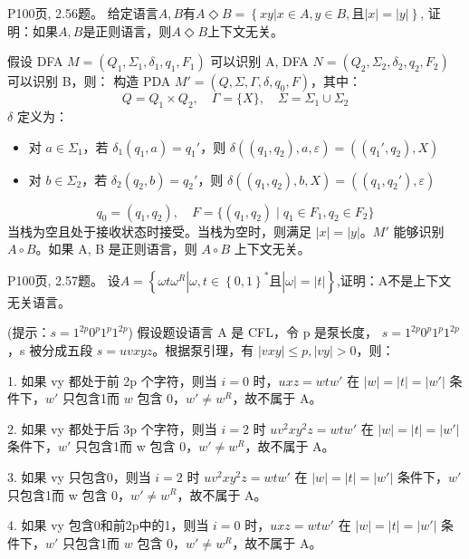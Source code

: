 \documentclass[11pt,addpoints,answers]{exam}
\begin{document}
\begin{questions}
    
	\question P100页, 2.56题。
    给定语言$A,B$有$A \Diamond B=\left\{xy|x\in A,y\in B,\text{且}|x|=|y|\right\}$, 证明：如果$A,B$是正则语言，则$A \Diamond B$上下文无关。
    \begin{solution}
		假设 DFA \( M = (Q_1, \Sigma_1, \delta_1, q_1, F_1) \) 可以识别 A, DFA \( N = (Q_2, \Sigma_2, \delta_2, q_2, F_2) \) 可以识别 B，则：
构造 PDA \( M' = (Q, \Sigma, \Gamma, \delta, q_0, F) \)，其中：
\[
Q = Q_1 \times Q_2, \quad \Gamma = \{X\}, \quad \Sigma = \Sigma_1 \cup \Sigma_2
\]
\(\delta\) 定义为：
\begin{itemize}
    \item 对 \( a \in \Sigma_1 \)，若 \( \delta_1(q_1, a) = q_1' \)，则 \( \delta((q_1, q_2), a, \varepsilon) = ((q_1', q_2), X) \)
    \item 对 \( b \in \Sigma_2 \)，若 \( \delta_2(q_2, b) = q_2' \)，则 \( \delta((q_1, q_2), b, X) = ((q_1, q_2'), \varepsilon) \)
\end{itemize}
\[
q_0 = (q_1, q_2), \quad F = \{(q_1, q_2) \mid q_1 \in F_1, q_2 \in F_2\}
\]
当栈为空且处于接收状态时接受。当栈为空时，则满足 \( |x| = |y| \)。\( M' \) 能够识别 \( A \circ B \)。如果 A, B 是正则语言，则 \( A \circ B \) 上下文无关。
	\end{solution} 


    
    \question P100页, 2.57题。
    设$A=\left\{\omega t \omega^{R}| \omega,t\in \left\{0,1\right\}^* \text{且} |\omega|=|t|\right\}$,证明：A不是上下文无关语言。
    \begin{solution}
		(提示：$s=1^{2p}0^p1^p1^{2p}$)
        假设题设语言 A 是 CFL，令 p 是泵长度， $s=1^{2p}0^p1^p1^{2p}$ ，s 被分成五段 \( s = uvxyz \)。根据泵引理，有 \( |vxy| \leq p, |vy| > 0 \)，则：
        
        1. 如果 vy 都处于前 2p 个字符，则当 \( i = 0 \) 时，\( uxz = wtw' \) 在 \( |w| = |t| = |w'| \) 条件下，\(w'\) 只包含1而 \( w \) 包含 0，\( w' \neq w^R \)，故不属于 A。
        
        2. 如果 vy 都处于后 3p 个字符，则当 \( i = 2 \) 时 \( uv^2xy^2z = wtw' \) 在 \( |w| = |t| = |w'| \) 条件下，\( w' \) 只包含1而 w 包含 0，\( w' \neq w^R \)，故不属于 A。
        
        3. 如果 vy 只包含0，则当 \( i = 2 \) 时 \( uv^2xy^2z = wtw' \) 在 \( |w| = |t| = |w'| \) 条件下，\( w' \) 只包含1而 w 包含 0，\( w' \neq w^R \)，故不属于 A。

        4. 如果 vy 包含0和前2p中的1，则当 \( i = 0 \) 时，\( uxz = wtw' \) 在 \( |w| = |t| = |w'| \) 条件下，\(w'\) 只包含1而 \( w \) 包含 0，\( w' \neq w^R \)，故不属于 A。


\end{solution}
\end{questions}
\end{document}
